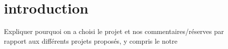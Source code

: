 \section*{introduction}

Expliquer pourquoi on a choisi le projet et nos commentaires/réserves par rapport aux différents projets proposés, y compris le notre
